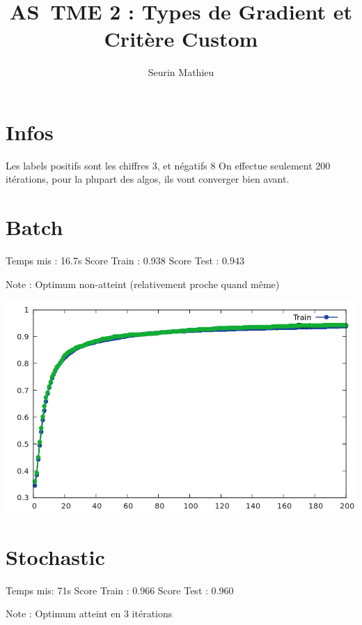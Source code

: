 \documentclass[a4paper]{article}
\title{AS TME 2 : Types de Gradient et Critère Custom}
\author{Seurin Mathieu}
\begin{document}
\maketitle

\section{Infos}

Les labels positifs sont les chiffres 3, et négatifs 8
On effectue seulement 200 itérations, pour la plupart des algos, ils vont converger bien avant.

\section{Batch}

Temps mis : 16.7s\newline
Score Train : 0.938\newline
Score Test : 0.943\newline

Note : Optimum non-atteint (relativement proche quand même)

\includegraphics[scale=0.4]{Batch.png}


\section{Stochastic}

Temps mis: 71s\newline
Score Train : 0.966\newline
Score Test : 0.960\newline

Note : Optimum atteint en 3 itérations
\end{document}

